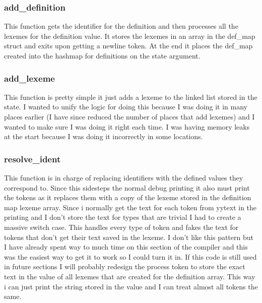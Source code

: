 \documentclass[11pt]{article}
\begin{document}
            \subsubsection{add\_definition}
                This function gets the identifier for the definition and then processes all the lexemes for the definition
                value. It stores the lexemes in an array in the def\_map struct and exits upon getting a newline token. At the end
                it places the def\_map created into the hashmap for definitions on the state argument.

            \subsubsection{add\_lexeme}
                This function is pretty simple it just adds a lexeme to the linked list stored in the state. I wanted to unify 
                the logic for doing this because I was doing it in many places earlier (I have since reduced the number of places that
                add lexemes) and I wanted to make sure I was doing it right each time. I was having memory leaks at the start because I
                was doing it incorrectly in some locations.

            \subsubsection{resolve\_ident}
                This function is in charge of replacing identifiers with the defined values they correspond to. Since this sidesteps the
                normal debug printing it also must print the tokens as it replaces them with a copy of the 
                lexeme stored in the definition map lexeme array. Since i normally get the text for each
                token from yytext in the printing and I don't store the text for types that are trivial I had to create
                a massive switch case. This handles every type of token and fakes the text for tokens that don't get their text
                saved in the lexeme. I don't like this pattern but I have already spent way to much time on this section of the compiler
                and this was the easiest way to get it to work so I could turn it in. If this code is still used in future sections
                I will probably redesign the process token to store the exact text in the value of all lexemes that are created for
                the definition array. This way i can just print the string stored in the value and I can treat almost all tokens the same.
\end{document}
